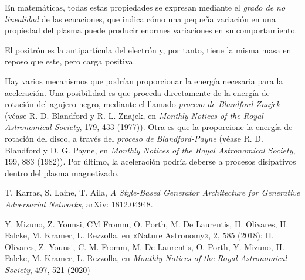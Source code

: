 \begin{description}[style=multiline,leftmargin=2em,labelwidth=1.5em]
\item[7.]\hypertarget{note:07-07}{}En matemáticas, todas estas propiedades se expresan mediante el \emph{grado de no linealidad} de las ecuaciones, que indica cómo una pequeña variación en una propiedad del plasma puede producir enormes variaciones en su comportamiento.

\item[8.]\hypertarget{note:07-08}{}El positrón es la antipartícula del electrón y, por tanto, tiene la misma masa en reposo que este, pero carga positiva.

\item[9.]\hypertarget{note:07-09}{}Hay varios mecanismos que podrían proporcionar la energía necesaria para la aceleración. Una posibilidad es que proceda directamente de la energía de rotación del agujero negro, mediante el llamado \emph{proceso de Blandford-Znajek} (véase R. D. Blandford y R. L. Znajek, en \emph{Monthly Notices of the Royal Astronomical Society}, 179, 433 (1977)). Otra es que la proporcione la energía de rotación del disco, a través del \emph{proceso de Blandford-Payne} (véase R. D. Blandford y D. G. Payne, en \emph{Monthly Notices of the Royal Astronomical Society}, 199, 883 (1982)). Por último, la aceleración podría deberse a procesos disipativos dentro del plasma magnetizado.

\item[10.]\hypertarget{note:07-10}{}T. Karras, S. Laine, T. Aila, \emph{A Style-Based Generator Architecture for Generative Adversarial Networks}, arXiv: 1812.04948.

\item[11.]\hypertarget{note:07-11}{}Y. Mizuno, Z. Younsi, CM Fromm, O. Porth, M. De Laurentis, H. Olivares, H. Falcke, M. Kramer, L. Rezzolla, en «Nature Astronomy», 2, 585 (2018); H. Olivares, Z. Younsi, C. M. Fromm, M. De Laurentis, O. Porth, Y. Mizuno, H. Falcke, M. Kramer, L. Rezzolla, en \emph{Monthly Notices of the Royal Astronomical Society}, 497, 521 (2020)

\end{description}
